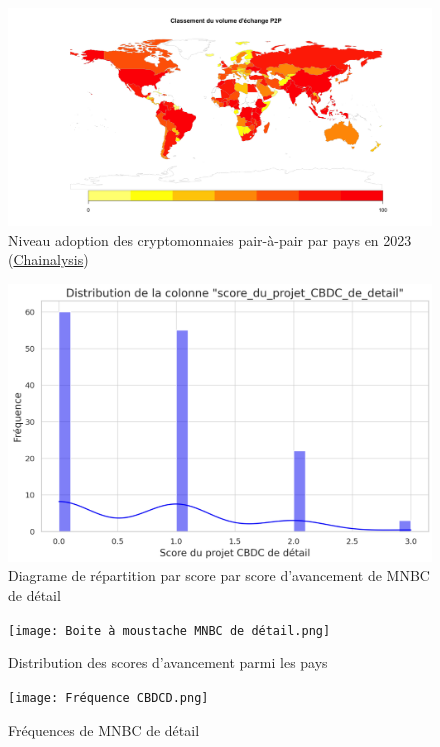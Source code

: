 \documentclass[12pt]{article}
\begin{document}
\begin{figure}[htbp]
    \centering
    \includegraphics[width=1\linewidth]{P2P.png}
    \caption{Niveau adoption des cryptomonnaies pair-à-pair par pays en 2023 (\href{https://www.chainalysis.com/}{Chainalysis})}
    \label{fig:P2P}
\end{figure}


\clearpage
\begin{figure}
    \centering
    \includegraphics[width=0.7\linewidth]{Graphique CBDC.png}
    \caption{Diagrame de répartition par score par score d'avancement de MNBC de détail}
    \label{fig:graphique-MNBC}
\end{figure}

\begin{figure}
    \centering
    \texttt{[image: Boite à moustache MNBC de détail.png]}
    \caption{Distribution des scores d'avancement parmi les pays}
    \label{fig:Boite-a-mousatche-MNBC}
\end{figure}


\begin{figure}
    \centering
    \texttt{[image: Fréquence CBDCD.png]}
    \caption{Fréquences de MNBC de détail}
    \label{fig:Frequences de MNBC de détail}
\end{figure}
\end{document}
